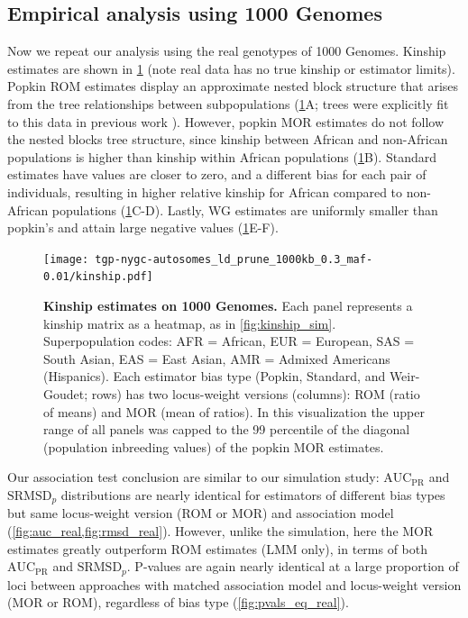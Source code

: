 \documentclass[11pt]{article}
\newcommand{\rmsd}{\text{SRMSD}_p}
\newcommand{\auc}{\text{AUC}_\text{PR}}
\begin{document}
\subsection{Empirical analysis using 1000 Genomes}

Now we repeat our analysis using the real genotypes of 1000 Genomes.
Kinship estimates are shown in \cref{fig:kinship_real} (note real data has no true kinship or estimator limits).
Popkin ROM estimates display an approximate nested block structure that arises from the tree relationships between subpopulations (\cref{fig:kinship_real}A; trees were explicitly fit to this data in previous work \citep{yao_limitations_2022}).
However, popkin MOR estimates do not follow the nested blocks tree structure, since kinship between African and non-African populations is higher than kinship within African populations (\cref{fig:kinship_real}B).
Standard estimates have values are closer to zero, and a different bias for each pair of individuals, resulting in higher relative kinship for African compared to non-African populations (\cref{fig:kinship_real}C-D).
Lastly, WG estimates are uniformly smaller than popkin's and attain large negative values (\cref{fig:kinship_real}E-F).

\begin{figure}[bp!]
  \centering
  \texttt{[image: tgp-nygc-autosomes\_ld\_prune\_1000kb\_0.3\_maf-0.01/kinship.pdf]}
  \caption{
    {\bf Kinship estimates on 1000 Genomes.}
    Each panel represents a kinship matrix as a heatmap, as in \cref{fig:kinship_sim}.
    Superpopulation codes: AFR = African, EUR = European, SAS = South Asian, EAS = East Asian, AMR = Admixed Americans (Hispanics).
    Each estimator bias type (Popkin, Standard, and Weir-Goudet; rows) has two locus-weight versions (columns): ROM (ratio of means) and MOR (mean of ratios).
    In this visualization the upper range of all panels was capped to the 99 percentile of the diagonal (population inbreeding values) of the popkin MOR estimates.
  }
  \label{fig:kinship_real}
\end{figure}

Our association test conclusion are similar to our simulation study: $\auc$ and $\rmsd$ distributions are nearly identical for estimators of different bias types but same locus-weight version (ROM or MOR) and association model (\cref{fig:auc_real,fig:rmsd_real}).
However, unlike the simulation, here the MOR estimates greatly outperform ROM estimates (LMM only), in terms of both $\auc$ and $\rmsd$.
P-values are again nearly identical at a large proportion of loci between approaches with matched association model and locus-weight version (MOR or ROM), regardless of bias type (\cref{fig:pvals_eq_real}).
\end{document}
